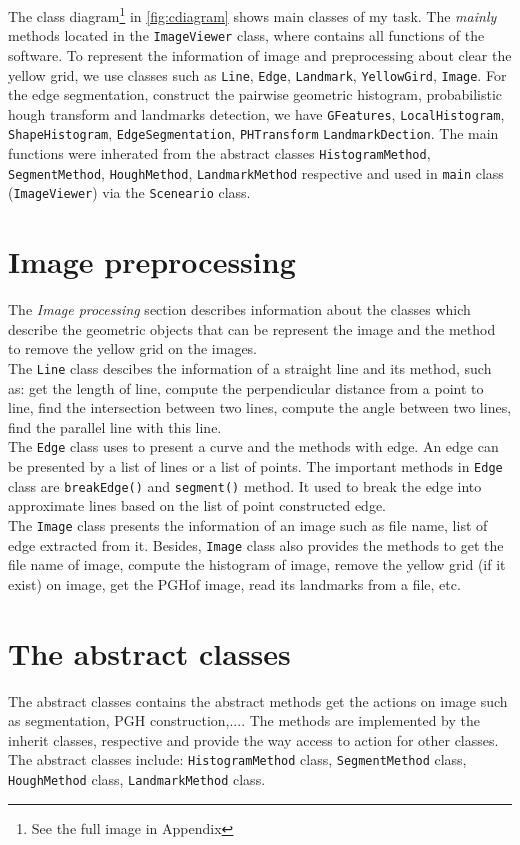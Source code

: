 The class diagram\footnote{See the full image in Appendix} in \ref{fig:cdiagram} shows main classes of my task. The \textit{mainly} methods located in the \texttt{ImageViewer} class, where contains all functions of the software. To represent the information of image and preprocessing about clear the yellow grid, we use classes such as \texttt{Line}, \texttt{Edge}, \texttt{Landmark}, \texttt{YellowGird}, \texttt{Image}. For the edge segmentation, construct the pairwise geometric histogram, probabilistic hough transform and landmarks detection, we have \texttt{GFeatures}, \texttt{LocalHistogram}, \texttt{ShapeHistogram}, \texttt{EdgeSegmentation}, \texttt{PHTransform} \texttt{LandmarkDection}. The main functions were inherated from the abstract classes \texttt{HistogramMethod}, \texttt{SegmentMethod}, \texttt{HoughMethod}, \texttt{LandmarkMethod} respective and used in \texttt{main} class (\texttt{ImageViewer}) via the \texttt{Sceneario} class. 
\section{Image preprocessing}
The \textit{Image processing} section describes information about the classes which describe the geometric objects that can be represent the image and the method to remove the yellow grid on the images.\\[0.2cm]
The \texttt{Line} class descibes the information of a straight line and its method, such as: get the length of line, compute the perpendicular distance from a point to line, find the intersection between two lines, compute the angle between two lines, find the parallel line with this line.\\[0.2cm]
The \texttt{Edge} class uses to present a curve and the methods with edge. An edge can be presented by a list of lines or a list of points. The important methods in \texttt{Edge} class are \texttt{breakEdge()} and \texttt{segment()} method. It used to break the edge into approximate lines based on the list of point constructed edge.\\[0.2cm]
The \texttt{Image} class presents the information of an image such as file name, list of edge extracted from it. Besides, \texttt{Image} class also provides the methods to get the file name of image, compute the histogram of image, remove the yellow grid (if it exist) on image, get the PGHof image, read its landmarks from a file, etc.
\section{The abstract classes}
The abstract classes contains the abstract methods get the actions on image such as segmentation, PGH construction,.... The methods are implemented by the inherit classes, respective and provide the way access to action for other classes. The abstract classes include: \texttt{HistogramMethod} class, \texttt{SegmentMethod} class, \texttt{HoughMethod} class, \texttt{LandmarkMethod} class.
